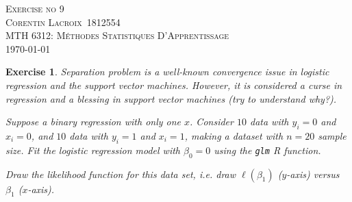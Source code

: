 \documentclass[12pt,a4paper]{article}
\def\StudentName{Corentin Lacroix}
\def\StudentMatricule{1812554}
\def\ExerciseNo{9}
\newtheorem{exercise}{Exercise}
\begin{document}
\begin{titlepage}
\begin{center}
\textsc{\LARGE Exercise no \ExerciseNo}\\[1.5cm]
\vspace{2in}
\textsc{\Large \StudentName~\StudentMatricule}\\[0.5cm]
\textsc{MTH 6312: Méthodes Statistiques D'Apprentissage}\\[0.5cm]
\today
\end{center}
\end{titlepage}

\begin{exercise}
Separation problem is a well-known convergence issue in logistic regression and the support vector machines. However, it is considered a curse in regression and a blessing in support vector machines (try to understand why?).

Suppose a binary regression with only one $x$. 
Consider $10$ data with $y_i=0$ and $x_i=0$, and $10$ data with $y_i=1$
and $x_i=1$, making a dataset with $n=20$ sample size. 
Fit the logistic regression model with $\beta_0=0$ using the \texttt{glm} R function.

Draw the likelihood function for this data set, i.e. draw $\ell(\beta_1)$ ($y$-axis) versus $\beta_1$ ($x$-axis).
\end{exercise}
\end{document}
